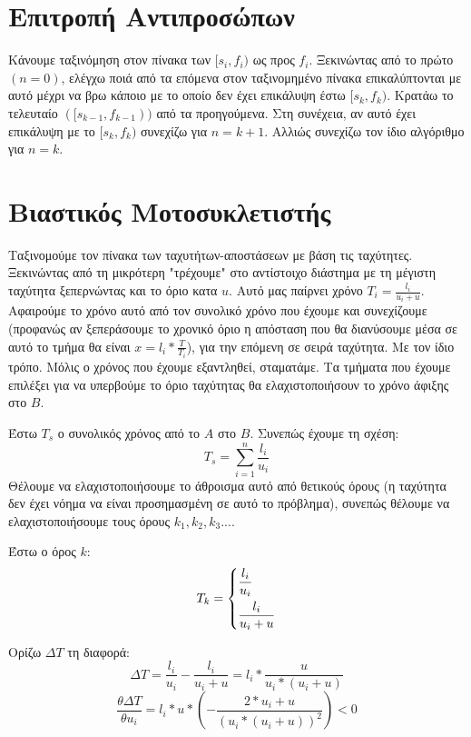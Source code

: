 \documentclass[a4paper,10pt]{article} \usepackage{anysize}
\begin{document}
\renewcommand{\labelenumi}{\roman{enumi})}
\renewcommand{\labelenumii}{(\arabic{enumii})}



\section{Επιτροπή Αντιπροσώπων} \setcounter{section}{1}
Κάνουμε ταξινόμηση στον πίνακα των $[s_i,f_i)$ ως προς $f_i$. Ξεκινώντας από
 το πρώτο $(n=0)$, ελέγχω ποιά από τα επόμενα στον ταξινομημένο πίνακα επικαλύπτονται
με αυτό μέχρι να βρω κάποιο με το οποίο δεν έχει επικάλυψη έστω $[s_k,f_k)$. Κρατάω
το τελευταίο $([s_{k-1},f_{k-1}))$ από τα προηγούμενα. Στη συνέχεια, αν αυτό έχει
επικάλυψη με το $[s_k,f_k)$ συνεχίζω για $n=k+1$. Αλλιώς συνεχίζω
τον ίδιο αλγόριθμο για $n=k$.


\vspace{3cm}

\section{Βιαστικός Μοτοσυκλετιστής}
Ταξινομούμε τον πίνακα των ταχυτήτων-αποστάσεων με βάση τις ταχύτητες.
Ξεκινώντας από τη μικρότερη "τρέχουμε" στο αντίστοιχο διάστημα με τη μέγιστη
ταχύτητα ξεπερνώντας και το όριο κατα $u$. Αυτό μας παίρνει χρόνο
$T_i=\frac{l_i}{u_i+u}$. Αφαιρούμε το χρόνο αυτό από τον συνολικό χρόνο που
έχουμε και συνεχίζουμε (προφανώς αν ξεπεράσουμε το χρονικό όριο η απόσταση που
θα διανύσουμε μέσα σε αυτό το τμήμα θα είναι $x=l_i*\frac{T}{T_i}$), για την
επόμενη σε σειρά ταχύτητα. Με τον ίδιο τρόπο. Μόλις ο χρόνος που έχουμε
εξαντληθεί, σταματάμε. Τα τμήματα που έχουμε επιλέξει για να υπερβούμε το όριο
ταχύτητας θα ελαχιστοποιήσουν το χρόνο άφιξης στο $B$.

Έστω $T_s$ ο συνολικός χρόνος από το $A$ στο $B$. Συνεπώς έχουμε τη σχέση:
\[
T_s=\sum_{i=1}^n{\frac{l_i}{u_i}}
\]
Θέλουμε να ελαχιστοποιήσουμε το άθροισμα αυτό από θετικούς όρους (η ταχύτητα
δεν έχει νόημα να είναι προσημασμένη σε αυτό το πρόβλημα), συνεπώς θέλουμε να
ελαχιστοποιήσουμε τους όρους $k_1, k_2, k_3 ...$.

Έστω ο όρος $k$:
\[
T_k=
	\begin{dcases}
	\frac{l_i}{u_i} \\
	\frac{l_i}{u_i+u}  
	\end{dcases}
\]

Ορίζω $\Delta{T}$ τη διαφορά:
\[
	\Delta{T}=\frac{l_i}{u_i} - \frac{l_i}{u_i+u} = l_i*\frac{u}{u_i*(u_i+u)}
\] 
\[
	\frac{\theta{\Delta{T}}}{\theta{u_i}} =
	l_i*u*(-\frac{2*u_i+u}{(u_i*(u_i+u))^2}) < 0
\]
\end{document}
